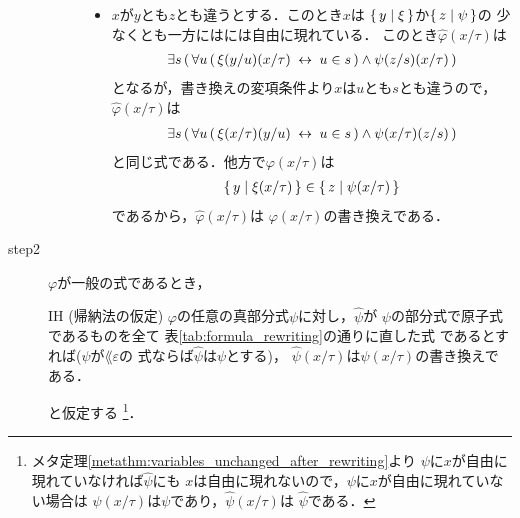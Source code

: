 \begin{metaprf}[第一]
\begin{description}
\begin{description}
\begin{itemize}
							\item $x$が$y$とも$z$とも違うとする．このとき$x$は
								$\{\, y \mid \xi\, \}$か$\{\, z \mid \psi\, \}$の
								少なくとも一方にはには自由に現れている．
								このとき$\widehat{\varphi}(x/\tau)$は
								\begin{align}
									\exists s\, (\, \forall u\, (\, \xi(y/u)(x/\tau) \hspace{0.25em}\leftrightarrow\hspace{0.25em} u \in s\, ) \wedge \psi(z/s)(x/\tau)\, )
								\end{align}
								となるが，書き換えの変項条件より$x$は$u$とも$s$とも違うので，
								$\widehat{\varphi}(x/\tau)$は
								\begin{align}
									\exists s\, (\, \forall u\, (\, \xi(x/\tau)(y/u) \hspace{0.25em}\leftrightarrow\hspace{0.25em} u \in s\, ) \wedge \psi(x/\tau)(z/s)\, )
								\end{align}
								と同じ式である．他方で$\varphi(x/\tau)$は
								\begin{align}
									\{\, y \mid \xi(x/\tau)\, \} \in \{\, z \mid \psi(x/\tau)\, \}
								\end{align}
								であるから，$\widehat{\varphi}(x/\tau)$は
								$\varphi(x/\tau)$の書き換えである．
						\end{itemize}
				\end{description}
			
			\item[step2] $\varphi$が一般の式であるとき，
				\begin{itembox}[l]{IH (帰納法の仮定)}
					$\varphi$の任意の真部分式$\psi$に対し，$\widehat{\psi}$が
					$\psi$の部分式で原子式であるものを全て
					表\ref{tab:formula_rewriting}の通りに直した式
					であるとすれば($\psi$が$\lang{\varepsilon}$の
					式ならば$\widehat{\psi}$は$\psi$とする)，
					$\widehat{\psi}(x/\tau)$は$\psi(x/\tau)$の書き換えである．
				\end{itembox}
				と仮定する
				\footnote{
					メタ定理\ref{metathm:variables_unchanged_after_rewriting}より
					$\psi$に$x$が自由に現れていなければ$\widehat{\psi}$にも
					$x$は自由に現れないので，$\psi$に$x$が自由に現れていない場合は
					$\psi(x/\tau)$は$\psi$であり，$\widehat{\psi}(x/\tau)$は
					$\widehat{\psi}$である．
				}．
				

\end{description}
\end{metaprf}

